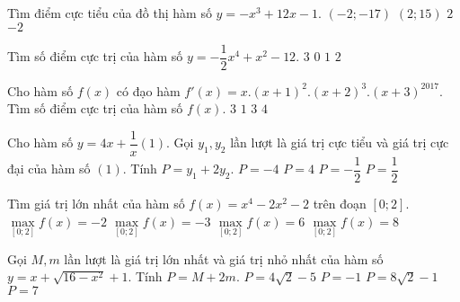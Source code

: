 \begin{ex}%
	Tìm điểm cực tiểu của đồ thị hàm số $y=-x^3+12x-1.$
	\choice
	{\True $(-2;-17)$}
	{$(2;15)$}
	{$2$}
	{$-2$}
\end{ex}
\begin{ex}%
	Tìm số điểm cực trị của hàm số $y=-\dfrac{1}{2}x^4+x^2-12.$
	\choice
	{\True $3$}
	{$0$}
	{$1$}
	{$2$}
\end{ex}
\begin{ex}%
	Cho hàm số $f(x)$ có đạo hàm $f'(x)=x.(x+1)^2.(x+2)^3.(x+3)^{2017}.$ Tìm số điểm cực trị của hàm số $f(x)$.
	\choice
	{\True $3$}
	{$1$}
	{$3$}
	{$4$}
\end{ex}
\begin{ex}%
	Cho hàm số $y=4x+\dfrac{1}{x} (1).$ Gọi $y_1, y_2$ lần lượt là giá trị cực tiểu và giá trị cực đại của hàm số $(1)$. Tính $P=y_1+2y_2.$
	\choice
	{\True $P=-4$}
	{$P=4$}
	{$P=-\dfrac{1}{2}$}
	{$P=\dfrac{1}{2}$}
\end{ex}
\begin{ex}%
	Tìm giá trị lớn nhất của hàm số $f(x)=x^4-2x^2-2$ trên đoạn $[0;2].$
	\choice
	{$\max\limits_{[0;2]}f(x)=-2$}
	{$\max\limits_{[0;2]}f(x)=-3$}
	{\True $\max\limits_{[0;2]}f(x)=6$}
	{$\max\limits_{[0;2]}f(x)=8$}
\end{ex}
\begin{ex}%
	Gọi $M, m$ lần lượt là giá trị lớn nhất và giá trị nhỏ nhất của hàm số $y=x+\sqrt{16-x^2}+1.$ Tính $P=M+2m.$
	\choice
	{\True $P=4\sqrt{2}-5$}
	{$P=-1$}
	{$P=8\sqrt{2}-1$}
	{$P=7$}
\end{ex}
